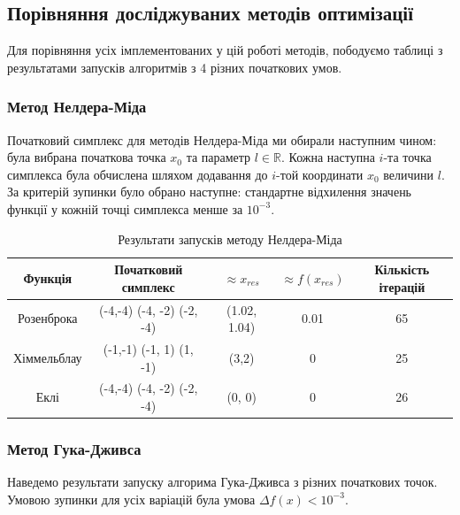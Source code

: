 \pagebreak
\subsection*{Порівняння досліджуваних методів оптимізації}
Для порівняння усіх імплементованих у цій роботі методів,
пободуємо таблиці з результатами запусків алгоритмів з 4
різних початкових умов.

\subsubsection*{Метод Нелдера-Міда}
Початковий симплекс для методів Нелдера-Міда ми обирали наступним чином:
була вибрана початкова точка $x_0$ та параметр $l \in \mathbb{R}$.
Кожна наступна $i$-та точка симплекса була обчислена шляхом додавання
до $i$-той координати $x_0$ величини $l$. За критерій зупинки
було обрано наступне: стандартне відхилення значень функції
у кожній точці симплекса менше за $10^{-3}$.

\begin{table}[h!]
    \centering
    \begin{tabular}{|c|c|c|c|c|}
        \hline
        \textbf{Функція} & \textbf{Початковий симплекс} & $\approx x_{res}$ & $\approx f(x_{res})$ & \textbf{Кількість ітерацій}  \\
        \hline
        Розенброка & (-4,-4) (-4, -2) (-2, -4) & (1.02, 1.04) & 0.01 & 65
        \\ \hline
        Хіммельблау & (-1,-1) (-1, 1) (1, -1) & (3,2) & 0 & 25
        \\ \hline
        Еклі & (-4,-4) (-4, -2) (-2, -4) & (0, 0) & 0 & 26
        \\ \hline
    \end{tabular}
    \caption{Результати запусків методу Нелдера-Міда}
\end{table}

\subsubsection*{Метод Гука-Дживса}

Наведемо результати запуску алгорима Гука-Дживса
з різних початкових точок.
Умовою зупинки для усіх варіацій була
умова $\Delta f(x) < 10^{-3}$.

